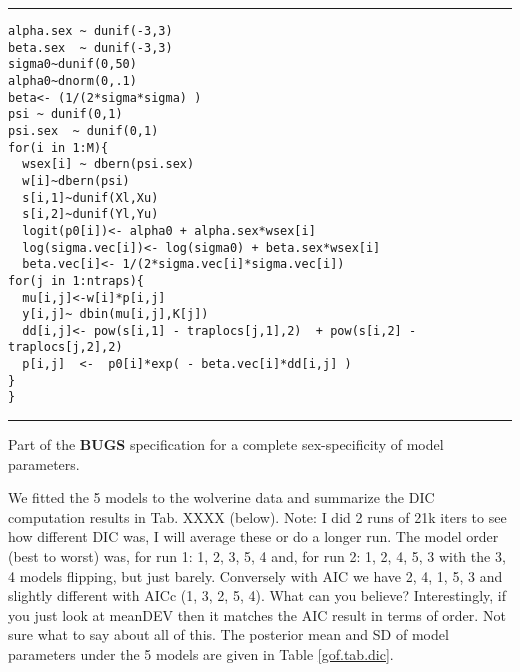 \begin{panel}[htp]
\centering
\rule[0.15in]{\textwidth}{.03in}
{\small
\begin{verbatim}
alpha.sex ~ dunif(-3,3)
beta.sex  ~ dunif(-3,3)
sigma0~dunif(0,50)
alpha0~dnorm(0,.1)
beta<- (1/(2*sigma*sigma) )
psi ~ dunif(0,1)
psi.sex  ~ dunif(0,1)
for(i in 1:M){
  wsex[i] ~ dbern(psi.sex)
  w[i]~dbern(psi)
  s[i,1]~dunif(Xl,Xu)
  s[i,2]~dunif(Yl,Yu)
  logit(p0[i])<- alpha0 + alpha.sex*wsex[i]
  log(sigma.vec[i])<- log(sigma0) + beta.sex*wsex[i]
  beta.vec[i]<- 1/(2*sigma.vec[i]*sigma.vec[i])
for(j in 1:ntraps){
  mu[i,j]<-w[i]*p[i,j]
  y[i,j]~ dbin(mu[i,j],K[j])
  dd[i,j]<- pow(s[i,1] - traplocs[j,1],2)  + pow(s[i,2] - traplocs[j,2],2)
  p[i,j]  <-  p0[i]*exp( - beta.vec[i]*dd[i,j] )
}
}
\end{verbatim}
}
\rule[-0.15in]{\textwidth}{.03in}
\caption{
Part of the {\bf BUGS} specification for a complete sex-specificity of model
parameters.
}
\label{gof.panel.sexmodel}
\end{panel}


We fitted the 5 models to the wolverine data and summarize
the DIC computation results in Tab. XXXX (below).  Note: I did 2 runs of 21k iters
to see how different DIC was, I will average these or do a longer run.
The model order (best to worst) was, for run 1: 1, 2, 3, 5, 4 and, for
run 2: 1, 2, 4, 5, 3 with the 3, 4 models
flipping, but just barely.
Conversely with AIC we have
 2, 4, 1, 5, 3 and slightly different with
AICc (1, 3, 2, 5, 4). What can you believe?
Interestingly, if you just look at meanDEV then it matches the AIC
result in terms of order. Not sure what to say about all of this.
The posterior mean and SD of model parameters under the 5 models are
given in Table \ref{gof.tab.dic}.

